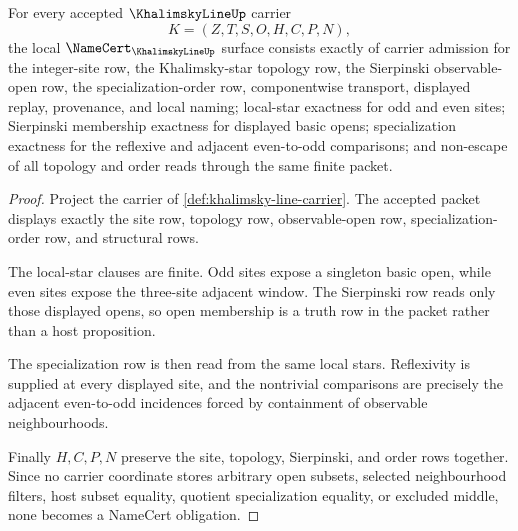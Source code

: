 \begin{theorem}
\label{thm:khalimsky-line-namecert-obligations}
For every accepted $\KhalimskyLineUp$ carrier
$$
K=(Z,T,S,O,H,C,P,N),
$$
the local $\NameCert_{\KhalimskyLineUp}$ surface consists exactly of carrier admission for the integer-site row, the Khalimsky-star topology row, the Sierpinski observable-open row, the specialization-order row, componentwise transport, displayed replay, provenance, and local naming; local-star exactness for odd and even sites; Sierpinski membership exactness for displayed basic opens; specialization exactness for the reflexive and adjacent even-to-odd comparisons; and non-escape of all topology and order reads through the same finite packet.
\end{theorem}
\begin{proof}
Project the carrier of \autoref{def:khalimsky-line-carrier}. The accepted packet displays exactly the site row, topology row, observable-open row, specialization-order row, and structural rows.

The local-star clauses are finite. Odd sites expose a singleton basic open, while even sites expose the three-site adjacent window. The Sierpinski row reads only those displayed opens, so open membership is a truth row in the packet rather than a host proposition.

The specialization row is then read from the same local stars. Reflexivity is supplied at every displayed site, and the nontrivial comparisons are precisely the adjacent even-to-odd incidences forced by containment of observable neighbourhoods.

Finally $H,C,P,N$ preserve the site, topology, Sierpinski, and order rows together. Since no carrier coordinate stores arbitrary open subsets, selected neighbourhood filters, host subset equality, quotient specialization equality, or excluded middle, none becomes a NameCert obligation.
\end{proof}

